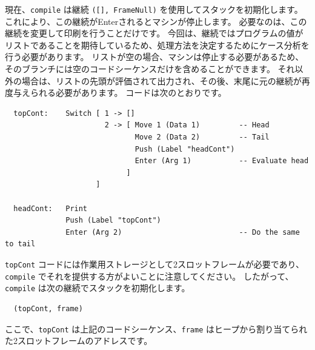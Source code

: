 \documentclass{jbook}
\begin{document}
現在、\texttt{compile} は継続 \texttt{([], FrameNull)} を使用してスタックを初期化します。
これにより、この継続がEnterされるとマシンが停止します。
必要なのは、この継続を変更して印刷を行うことだけです。
今回は、継続ではプログラムの値がリストであることを期待しているため、処理方法を決定するためにケース分析を行う必要があります。
リストが空の場合、マシンは停止する必要があるため、そのブランチには空のコードシーケンスだけを含めることができます。
それ以外の場合は、リストの先頭が評価されて出力され、その後、末尾に元の継続が再度与えられる必要があります。
コードは次のとおりです。

\begin{verbatim}
  topCont:    Switch [ 1 -> []
                       2 -> [ Move 1 (Data 1)         -- Head
                              Move 2 (Data 2)         -- Tail
                              Push (Label "headCont")
                              Enter (Arg 1)           -- Evaluate head
                            ]
                     ]

  headCont:   Print
              Push (Label "topCont")
              Enter (Arg 2)                           -- Do the same to tail
\end{verbatim}

\texttt{topCont} コードには作業用ストレージとして2スロットフレームが必要であり、\texttt{compile} でそれを提供する方がよいことに注意してください。
したがって、\texttt{compile} は次の継続でスタックを初期化します。

\begin{verbatim}
  (topCont, frame)
\end{verbatim}

ここで、\texttt{topCont} は上記のコードシーケンス、\texttt{frame} はヒープから割り当てられた2スロットフレームのアドレスです。
\end{document}
